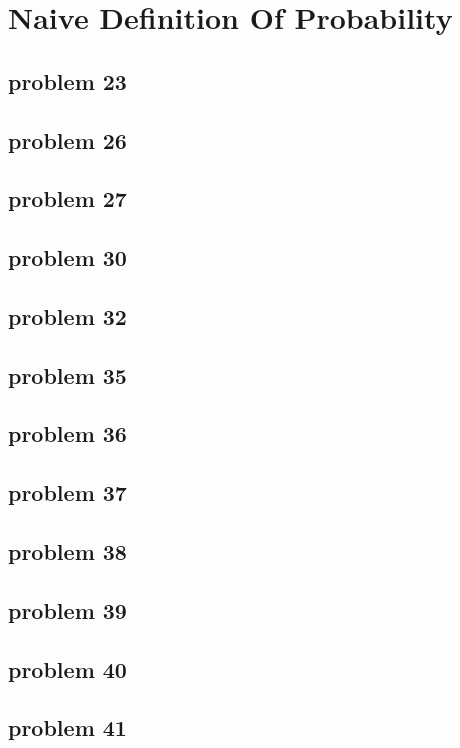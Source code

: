 \section{Naive Definition Of Probability}

\subsection{problem 23}


\subsection{problem 26}


\subsection{problem 27}


\subsection{problem 30}


\subsection{problem 32}


\subsection{problem 35}


\subsection{problem 36}


\subsection{problem 37}


\subsection{problem 38}


\subsection{problem 39}


\subsection{problem 40}


\subsection{problem 41}
